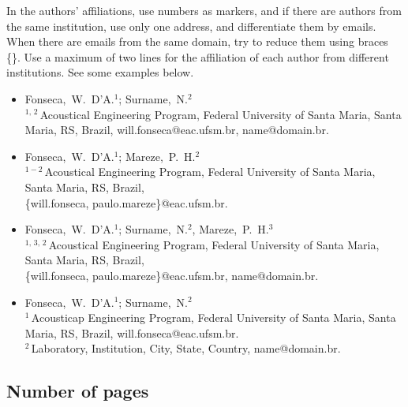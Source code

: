 In the authors' affiliations, use numbers as markers, and if there are authors from the same institution, use only one address, and differentiate them by emails. When there are emails from the same domain, try to reduce them using braces \{\}. Use a maximum of two lines for the affiliation of each author from different institutions. See some examples below.
%
\begin{flushleft}
\vspace{-0.25\baselineskip}
\begin{itemize}[topsep=-1ex,align=left,leftmargin=0.2cm] \itemsep=4pt

	\item Fonseca,~W.~D'A.$^1$; Surname,~N.$^2$\\[6pt]	
	$^{1,\,2}$\,Acoustical Engineering Program, Federal University of Santa Maria, Santa Maria, RS, Brazil, 
	 will.fonseca@eac.ufsm.br, name@domain.br.
	
	\item Fonseca,~W.~D'A.$^1$; Mareze,~P.~H.$^2$\\[6pt]	
	$^{1-2}$\,Acoustical Engineering Program, Federal University of Santa Maria, Santa Maria, RS, Brazil,\\
	\{will.fonseca, paulo.mareze\}@eac.ufsm.br.
	
	\item Fonseca,~W.~D'A.$^1$; Surname,~N.$^2$, Mareze,~P.~H.$^3$\\[6pt]	
	$^{1,\,3,\,2}$\,Acoustical Engineering Program, Federal University of Santa Maria, Santa Maria, RS, Brazil,\\
	\{will.fonseca, paulo.mareze\}@eac.ufsm.br, name@domain.br.

	\item Fonseca,~W.~D'A.$^1$; Surname,~N.$^2$\\[6pt]	
	$^{1}$\,Acousticap Engineering Program, Federal University of Santa Maria, Santa Maria, RS, Brazil,
	will.fonseca@eac.ufsm.br.\\[4pt]		
	$^2$\,Laboratory, Institution, City, State, Country, name@domain.br.	
\end{itemize}
\vspace{-0.4\baselineskip}
\end{flushleft}

\subsection{Number of pages}

